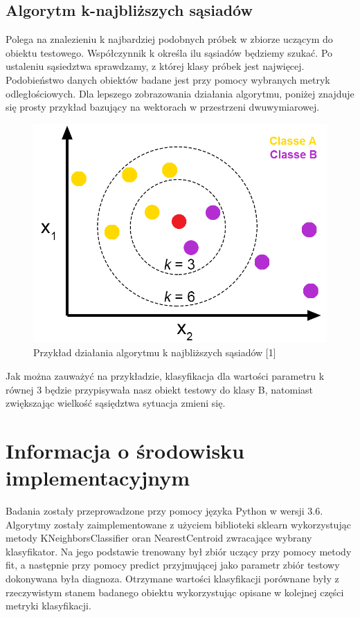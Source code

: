 \documentclass[12pt]{article}
\begin{document}
\subsection{Algorytm k-najbliższych sąsiadów}
\indent Polega na znalezieniu k najbardziej podobnych próbek w zbiorze uczącym do obiektu testowego. Współczynnik k określa ilu sąsiadów będziemy szukać. Po ustaleniu sąsiedztwa sprawdzamy, z której klasy próbek jest najwięcej. Podobieństwo danych obiektów badane jest przy pomocy wybranych metryk odległościowych. Dla lepszego zobrazowania działania algorytmu, poniżej znajduje się prosty przykład bazujący na wektorach w przestrzeni dwuwymiarowej. \newline
\begin{figure}[H]
	\centering
		\includegraphics[scale=0.6]{images/knn_alg_example.png}
	\caption{Przykład działania algorytmu k najbliższych sąsiadów [1]}
\end{figure}

\indent Jak można zauważyć na przykładzie, klasyfikacja dla wartości parametru k równej 3 będzie przypisywała nasz obiekt testowy do klasy B, natomiast zwiększając wielkość sąsiędztwa sytuacja zmieni się.
\section{Informacja o środowisku implementacyjnym}

\indent Badania zostały przeprowadzone przy pomocy języka Python w wersji 3.6. Algorytmy zostały zaimplementowane z użyciem biblioteki sklearn wykorzystując metody KNeighborsClassifier oran NearestCentroid zwracające wybrany klasyfikator. Na jego podstawie trenowany był zbiór uczący przy pomocy metody fit, a następnie przy pomocy predict przyjmującej jako parametr zbiór testowy dokonywana była diagnoza. Otrzymane wartości klasyfikacji porównane były z rzeczywistym stanem badanego obiektu wykorzystując opisane w kolejnej części metryki klasyfikacji.
\end{document}
